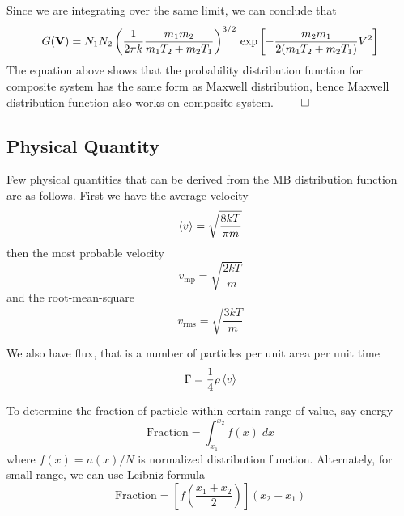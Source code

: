 \documentclass[../../../Main.tex]{subfiles}
\begin{document}
Since we are integrating over the same limit, we can conclude that 
\begin{equation*}
    G(\mathbf{V})= N_1 N_2 \left(\frac{1}{2\pi k}\frac{m_1m_2}{m_1T_2+ m_2T_1}\right)^{3/2}\\
    \exp \left[-\frac{m_2m_1}{2 (m_1T_2+ m_2T_1)} V^2\right] 
\end{equation*} 
The equation above shows that the probability distribution function for composite system has the same form as Maxwell distribution, hence Maxwell distribution function also works on composite system. $\qed$

\subsection{Physical Quantity}
Few physical quantities that can be derived from the MB distribution function are as follows. First we have the average velocity
\begin{equation*}
    \braket{v}=\sqrt{\frac{8kT}{\pi m}}
\end{equation*}
then the most probable velocity 
\begin{equation*}
    v_\text{mp}=\sqrt{\frac{2kT}{m}}
\end{equation*}
and the root-mean-square 
\begin{equation*}
    v_\text{rms}=\sqrt{\frac{3kT}{m}}
\end{equation*}

We also have flux, that is a number of particles per unit area per unit time
\begin{equation*}
    \Gamma=\frac{1}{4}\rho\braket{v}
\end{equation*}

To determine the fraction of particle within certain range of value, say energy
\begin{equation*}
    \text{Fraction}=\int_{x_1}^{x_2}f(x)\;dx
\end{equation*}
where $f(x)=n(x)/N$ is normalized distribution function. Alternately, for small range, we can use Leibniz formula
\begin{equation*}
    \text{Fraction}=\left[f\left(\frac{x_1+x_2}{2}\right)\right](x_2-x_1)
\end{equation*}
\end{document}

